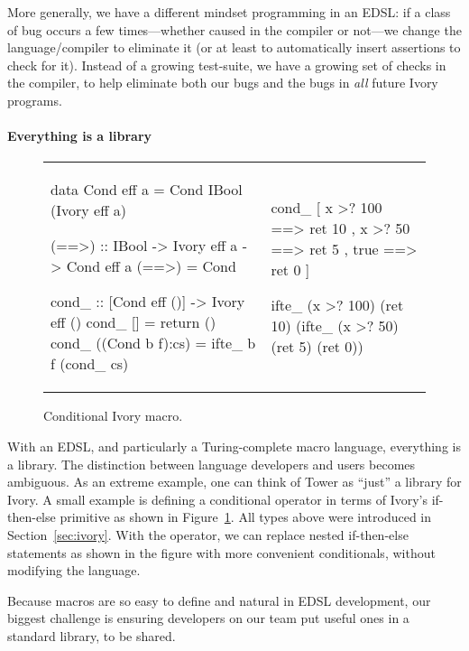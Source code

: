 More generally, we have a different mindset programming in an EDSL: if a class
of bug occurs a few times---whether caused in the compiler or not---we change
the language/compiler to eliminate it (or at least to automatically insert
assertions to check for it).  Instead of a growing test-suite, we
have a growing set of checks in the compiler, to help eliminate both our bugs
and the bugs in \emph{all} future Ivory programs.

\paragraph{Everything is a library}

\begin{figure}
  \begin{tabular}{p{}|p{}}
    \begin{smcode}
data Cond eff a =
  Cond IBool (Ivory eff a)

(==>) :: IBool -> Ivory eff a
      -> Cond eff a
(==>) = Cond

cond_ :: [Cond eff ()]
      -> Ivory eff ()
cond_ [] = return ()
cond_ ((Cond b f):cs) =
  ifte_ b f (cond_ cs)
    \end{smcode} &
    \begin{smcode}
cond_
  [ x >? 100 ==> ret 10
  , x >? 50  ==> ret 5
  , true     ==> ret 0 ]

ifte_ (x >? 100)
 (ret 10)
 (ifte_ (x >? 50)
   (ret 5)
     (ret 0))
    \end{smcode}
  \end{tabular}
  \caption{Conditional Ivory macro.}
  \label{fig:ivory-cond}
\end{figure}

With an EDSL, and particularly a Turing-complete macro language, everything is a
library.  The distinction between language developers and users becomes
ambiguous.  As an extreme example, one can think of Tower as ``just'' a library
for Ivory.  A small example is defining a conditional operator in terms of
Ivory's if-then-else primitive as shown in Figure~\ref{fig:ivory-cond}.  All
types above were introduced in Section~\ref{sec:ivory}.  With the 
operator, we can replace nested if-then-else statements as shown in the figure
with more convenient conditionals, without modifying the language.

Because macros are so easy to define and natural in EDSL development, our
biggest challenge is ensuring developers on our team put useful ones in a
standard library, to be shared.


